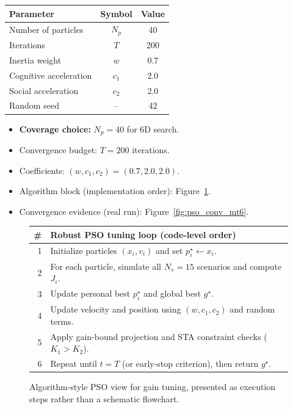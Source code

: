 \documentclass[10pt, a4paper]{article}
\begin{document}
\begin{center}
\small
\begin{tabular}{@{}lcc@{}}
\toprule
\textbf{Parameter}         & \textbf{Symbol} & \textbf{Value} \\
\midrule
Number of particles        & $N_p$           & 40 \\
Iterations                 & $T$             & 200 \\
Inertia weight             & $w$             & 0.7 \\
Cognitive acceleration     & $c_1$           & 2.0 \\
Social acceleration        & $c_2$           & 2.0 \\
Random seed                & --              & 42 \\
\bottomrule
\end{tabular}
\end{center}

\begin{itemize}[leftmargin=1.5em,itemsep=0.2em]
  \item \textbf{Coverage choice:} $N_p=40$ for 6D search.
  \item Convergence budget: $T=200$ iterations.
  \item Coefficients: $(w,c_1,c_2)=(0.7,2.0,2.0)$.
  \item Algorithm block (implementation order): Figure~\ref{fig:pso_algo_block}.
  \item Convergence evidence (real run): Figure~\ref{fig:pso_conv_mt6}.
\end{itemize}

\begin{figure}[t]
\centering
\small
\setlength{\tabcolsep}{4pt}
\renewcommand{\arraystretch}{1.12}
\begin{tabular}{@{}r p{}@{}}
\toprule
\# & \textbf{Robust PSO tuning loop (code-level order)} \\
\midrule
1 & Initialize particles $(x_i,v_i)$ and set $p_i^\star \leftarrow x_i$. \\
2 & For each particle, simulate all $N_s=15$ scenarios and compute $J_i$. \\
3 & Update personal best $p_i^\star$ and global best $g^\star$. \\
4 & Update velocity and position using $(w,c_1,c_2)$ and random terms. \\
5 & Apply gain-bound projection and STA constraint checks ($K_1>K_2$). \\
6 & Repeat until $t=T$ (or early-stop criterion), then return $g^\star$. \\
\bottomrule
\end{tabular}
\caption{Algorithm-style PSO view for gain tuning, presented as execution steps rather than a schematic flowchart.}
\label{fig:pso_algo_block}
\end{figure}
\end{document}
